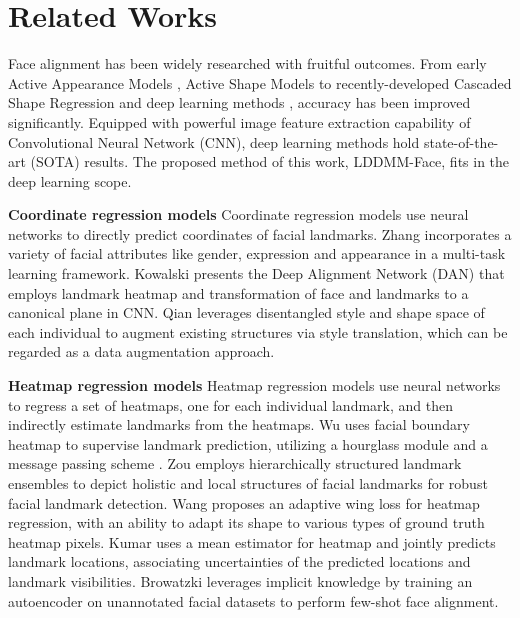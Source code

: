 \documentclass[10pt,twocolumn,letterpaper]{article}
\begin{document}
\section{Related Works}\label{related works}
Face alignment has been widely researched with fruitful outcomes. From early Active Appearance Models \cite{cootes2001active,matthews2004active,kahraman2007active,saragih2007nonlinear}, Active Shape Models \cite{milborrow2008locating} to recently-developed Cascaded Shape Regression
\cite{xiong2013supervised,su2019soft,kazemi2014one,ren2014face,lee2015face,zhu2015face,chen2014joint,tuzel2016robust} and deep learning methods \cite{zhou2013extensive,zhang2016learning,trigeorgis2016mnemonic,xiao2016robust,fan2016approaching,bulat2016two,yang2017stacked,kowalski2017deep,newell2016stacked}, accuracy has been improved significantly. Equipped with powerful image feature extraction capability of Convolutional Neural Network (CNN), deep learning methods hold state-of-the-art (SOTA) results. The proposed method of this work, LDDMM-Face, fits in the deep learning scope.

{\bf Coordinate regression models}
Coordinate regression models use neural networks to directly predict coordinates of facial landmarks. Zhang \etal \cite{zhang2016learning} incorporates a variety of facial attributes like gender, expression and appearance in a multi-task learning framework. Kowalski \etal \cite{kowalski2017deep} presents the Deep Alignment Network (DAN) that employs landmark heatmap and transformation of face and landmarks to a canonical plane in CNN. 
Qian \etal \cite{qian2019aggregation} leverages disentangled style and shape space of each individual to augment existing structures via style translation, which can be regarded as a data augmentation approach. 

{\bf Heatmap regression models}
Heatmap regression models use neural networks to regress a set of heatmaps, one for each individual landmark, and then indirectly estimate landmarks from the heatmaps. Wu \etal \cite{Wu_2018_CVPR} uses facial boundary heatmap to supervise landmark prediction, utilizing a hourglass module \cite{newell2016stacked} and a message passing scheme \cite{chu2016structured}. Zou \etal \cite{zou2019learning} employs hierarchically structured landmark ensembles to depict holistic and local structures of facial landmarks for robust facial landmark detection. Wang \etal \cite{wang2019adaptive} proposes an adaptive wing loss for heatmap regression, with an ability to adapt its shape to various types of ground truth heatmap pixels. Kumar \etal \cite{kumar2020luvli} uses a mean estimator for heatmap and jointly predicts landmark locations, associating uncertainties of the predicted locations and landmark visibilities. Browatzki \etal \cite{browatzki20203fabrec} leverages implicit knowledge by training an autoencoder on unannotated facial datasets to perform few-shot face alignment.
 
\end{document}
